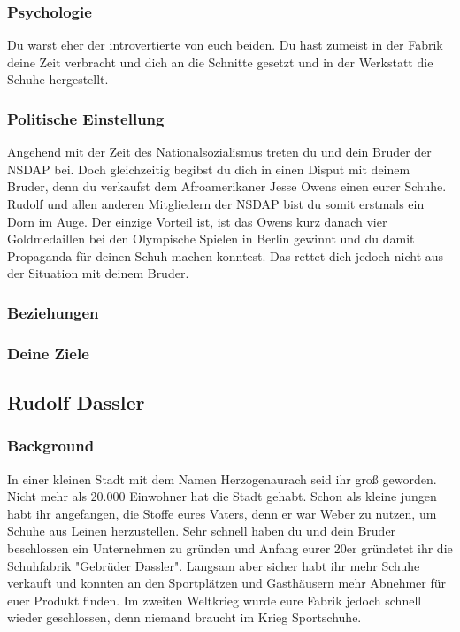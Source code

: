 \documentclass[12pt, a4paper, openany]{report}
\begin{document}
\subsubsection{Psychologie}
Du warst eher der introvertierte von euch beiden. Du hast zumeist in der Fabrik deine Zeit verbracht und dich an die Schnitte gesetzt und in der Werkstatt die Schuhe hergestellt. 

\subsubsection{Politische Einstellung}
Angehend mit der Zeit des Nationalsozialismus treten du und dein Bruder der NSDAP bei. Doch gleichzeitig begibst du dich in einen Disput mit deinem Bruder, denn du verkaufst dem Afroamerikaner Jesse Owens einen eurer Schuhe. Rudolf und allen anderen Mitgliedern der NSDAP bist du somit erstmals ein Dorn im Auge. Der einzige Vorteil ist, ist das Owens kurz danach vier Goldmedaillen bei den Olympische Spielen in Berlin gewinnt und du damit Propaganda für deinen Schuh machen konntest. Das rettet dich jedoch nicht aus der Situation mit deinem Bruder. 


\subsubsection{Beziehungen}

\subsubsection{Deine Ziele}

\subsection{Rudolf Dassler}
\subsubsection{Background}
In einer kleinen Stadt mit dem Namen Herzogenaurach seid ihr groß geworden. Nicht mehr als 20.000 Einwohner hat die Stadt gehabt. Schon als kleine jungen habt ihr angefangen, die Stoffe eures Vaters, denn er war Weber zu nutzen, um Schuhe aus Leinen herzustellen. Sehr schnell haben du und dein Bruder beschlossen ein Unternehmen zu gründen und Anfang eurer 20er gründetet ihr die Schuhfabrik "Gebrüder Dassler". Langsam aber sicher habt ihr mehr Schuhe verkauft und konnten an den Sportplätzen und Gasthäusern mehr Abnehmer für euer Produkt finden. Im zweiten Weltkrieg wurde eure Fabrik jedoch schnell wieder geschlossen, denn niemand braucht im Krieg Sportschuhe. \\
\end{document}
